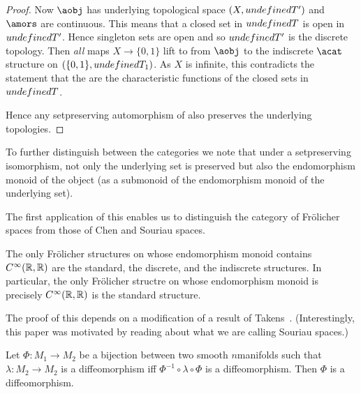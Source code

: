 \documentclass[%
a4paper,%
arxiv,%
defaults
]{myclass}
\begin{document}
\begin{proof}
Now \(\aobj\) has underlying topological space \((X, \m{T}')\) and \(\amors\) are continuous.
This means that a closed set in \(\m{T}\) is open in \(\m{T}'\).
Hence singleton sets are open and so \(\m{T}'\) is the discrete topology.
Then \emph{all} maps \(X \to \{0,1\}\) lift to \amors from \(\aobj\) to the indiscrete \(\acat\)\enhyp{}structure on \((\{0,1\}, \m{T}_1)\).
As \(X\) is infinite, this contradicts the statement that the \amors are the characteristic functions of the closed sets in \(\m{T}\).

Hence any set\enhyp{}preserving automorphism of \acat also preserves the underlying topologies.
\end{proof}

To further distinguish between the categories we note that under a set\enhyp{}preserving isomorphism, not only the underlying set is preserved but also the endomorphism monoid of the object (as a submonoid of the endomorphism monoid of the underlying set).

The first application of this enables us to distinguish the category of Fr\"olicher spaces from those of Chen and Souriau spaces.

\begin{proposition}
\label{prop:uniquer}
The only Fr\"olicher structures on \R whose endomorphism monoid contains \(C^\infty(\mathbb{R},\mathbb{R})\) are the standard, the discrete, and the indiscrete structures.
In particular, the only Fr\"olicher structre on \R whose endomorphism monoid is precisely \(C^\infty(\mathbb{R},\mathbb{R})\) is the standard structure.
\end{proposition}

The proof of this depends on a modification of a result of Takens~\cite{ft}.
(Interestingly, this paper was motivated by reading about what we are calling Souriau spaces.)

\begin{theorem}{{\cite[Theorem~1]{ft}}}
Let \(\Phi \colon M_1 \to M_2\) be a bijection between two smooth \(n\)\enhyp{}manifolds such that \(\lambda \colon M_2 \to M_2\) is a diffeomorphism iff \(\Phi^{-1} \circ \lambda \circ \Phi\) is a diffeomorphism.
Then \(\Phi\) is a diffeomorphism. \noproof
\end{theorem}
\end{document}
